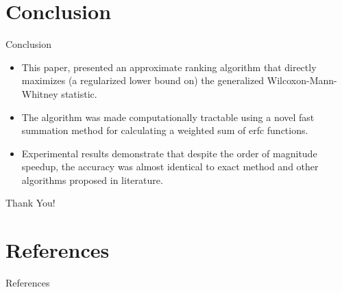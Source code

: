 \documentclass[8pt]{beamer}
\renewcommand{\|}[1][.3em]{\hspace{#1}|\hspace{#1}}
\renewcommand{\,}[1][.3em]{,\hspace{#1}}
\newlength{\wideitemsep}
\let\olditem\item
\renewcommand{\item}{\setlength{\itemsep}{\wideitemsep}\olditem}
\renewcommand{\,}{,\hspace{3pt}}
\renewcommand{\|}{\hspace{3pt}|\hspace{3pt}}
\begin{document}
\section{Conclusion}
\begin{frame}{Conclusion}
    \begin{itemize}
    \item This paper, presented an approximate ranking algorithm that directly maximizes (a regularized lower bound on) the generalized Wilcoxon-Mann-Whitney statistic.
    \item The algorithm was made computationally tractable using a novel fast summation method for calculating a weighted sum of erfc functions.
    \item Experimental results demonstrate that despite the order of magnitude speedup, the accuracy was almost identical to exact method and other algorithms proposed in literature.
    \end{itemize}
\end{frame}

\begin{frame}{}
    \begin{center}
    \vspace{5em}
    {\fontsize{20}{50}\selectfont Thank You!}
    \end{center}
\end{frame}

\section{References}
\begin{frame}{References}
    \nocite{*}
    {\scriptsize
    
    
    }
\end{frame}

\appendix
\end{document}
